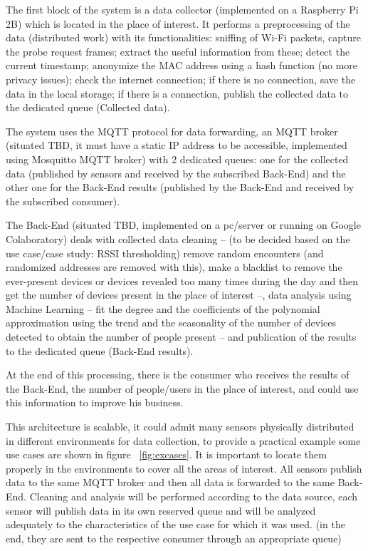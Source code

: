 The first block of the system is a data collector (implemented on a Raspberry Pi 2B) which is located in the place of interest. It performs a preprocessing of the data (distributed work) with its functionalities: sniffing of Wi-Fi packets, capture the probe request frames; extract the useful information from these; detect the current timestamp; anonymize the MAC address using a hash function (no more privacy issues); check the internet connection; if there is no connection, save the data in the local storage; if there is a connection, publish the collected data to the dedicated queue (Collected data).

The system uses the MQTT protocol for data forwarding, an MQTT broker (situated TBD, it must have a static IP address to be accessible, implemented using Mosquitto MQTT broker) with 2 dedicated queues: one for the collected data (published by sensors and received by the subscribed Back-End) and the other one for the Back-End results (published by the Back-End and received by the subscribed consumer).

The Back-End (situated TBD, implemented on a pc/server or running on Google Colaboratory) deals with collected data cleaning -- (to be decided based on the use case/case study: RSSI thresholding) remove random encounters (and randomized addresses are removed with this), make a blacklist to remove the ever-present devices or devices revealed too many times during the day and then get the number of devices present in the place of interest --, data analysis using Machine Learning -- fit the degree and the coefficients of the polynomial approximation using the trend and the seasonality of the number of devices detected to obtain the number of people present -- and publication of the results to the dedicated queue (Back-End results).

At the end of this processing, there is the consumer who receives the results of the Back-End, the number of people/users in the place of interest, and could use this information to improve his business.

This architecture is scalable, it could admit many sensors physically distributed in different environments for data collection, to provide a practical example some use cases are shown in figure ~\ref{fig:excases}.  It is important to locate them properly in the environments to cover all the areas of interest. All sensors publish data to the same MQTT broker and then all data is forwarded to the same Back-End. Cleaning and analysis will be performed according to the data source, each sensor will publish data in its own reserved queue and will be analyzed adequately to the characteristics of the use case for which it was used. (in the end, they are sent to the respective consumer through an appropriate queue)


